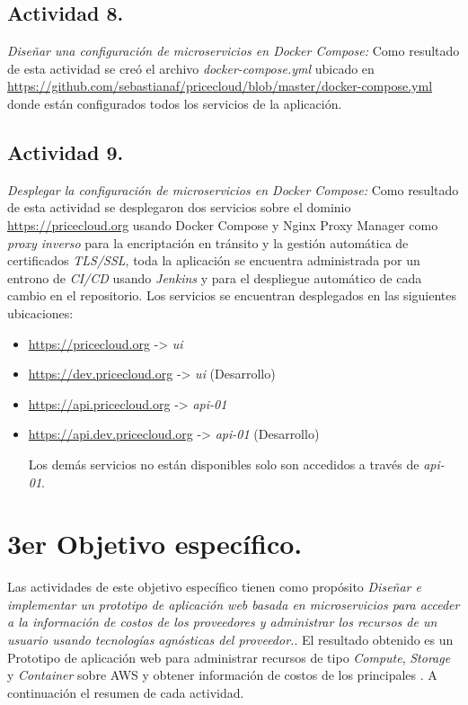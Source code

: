 \subsection{Actividad 8.}
\emph{Diseñar una configuración de microservicios en \gls{Docker Compose}:}
\newline\newline
Como resultado de esta actividad se creó el archivo \emph{docker-compose.yml} ubicado en \url{https://github.com/sebastianaf/pricecloud/blob/master/docker-compose.yml} donde están configurados todos los servicios de la aplicación.

\subsection{Actividad 9.}
\emph{Desplegar la configuración de microservicios en \gls{Docker Compose}:}
\newline\newline
Como resultado de esta actividad se desplegaron dos servicios sobre el dominio \url{https://pricecloud.org} usando \gls{Docker Compose} y \gls{Nginx Proxy Manager} como \emph{proxy inverso} para la encriptación en tránsito  y la gestión automática de certificados \emph{TLS/SSL}, toda la aplicación se encuentra administrada por un entrono de \emph{CI/CD} usando \emph{Jenkins} y para el despliegue automático de cada cambio en el repositorio.
\newline\newline
Los servicios se encuentran desplegados en las siguientes ubicaciones:
\begin{itemize}
    \item \url{https://pricecloud.org} -> \emph{ui}
    \item \url{https://dev.pricecloud.org} -> \emph{ui} (Desarrollo)
    \item \url{https://api.pricecloud.org} -> \emph{api-01}
    \item \url{https://api.dev.pricecloud.org} -> \emph{api-01} (Desarrollo)

          Los demás servicios no están disponibles solo son accedidos a través de \emph{api-01}.
\end{itemize}


\section{3er Objetivo específico.}
Las actividades de este objetivo específico tienen como propósito \emph{Diseñar e implementar un prototipo de aplicación web basada en microservicios para acceder a la información de costos de los proveedores y administrar los recursos de un usuario usando tecnologías agnósticas del proveedor.}. El resultado obtenido es un Prototipo de aplicación web para administrar recursos de tipo \emph{Compute}, \emph{Storage} y \emph{Container} sobre \acrshort{AWS} y obtener información de costos de los principales . A continuación el resumen de cada actividad.

